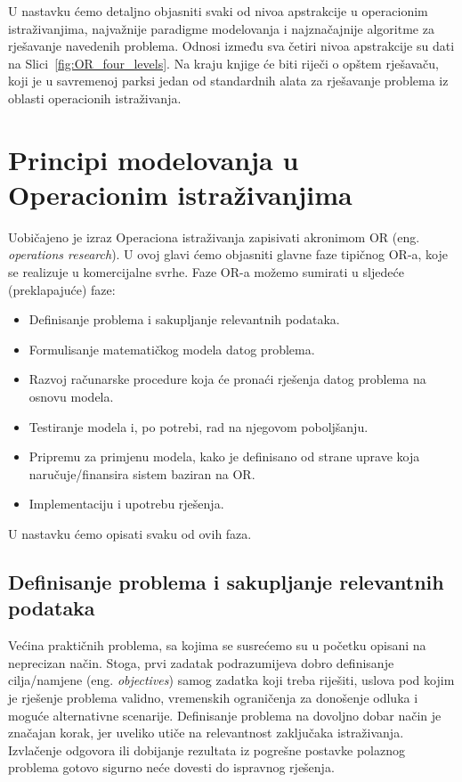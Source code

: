 \documentclass[a4paper, utf8, 11pt, colorlinks]{book}
\theoremstyle{definition}
\begin{document}
U nastavku ćemo detaljno objasniti svaki od nivoa apstrakcije u operacionim istraživanjima, najvažnije paradigme modelovanja i najznačajnije algoritme za rješavanje navedenih problema. Odnosi između sva četiri nivoa apstrakcije su dati na Slici~\ref{fig:OR_four_levels}. 
 Na kraju knjige će biti riječi o opštem rješavaču, koji je u savremenoj parksi jedan od standardnih alata za rješavanje problema iz oblasti operacionih istraživanja.
 
 
\chapter{Principi modelovanja u Operacionim istraživanjima}
Uobičajeno je izraz Operaciona istraživanja zapisivati akronimom OR (eng. \emph{operations research}). 
U ovoj glavi ćemo objasniti   glavne faze tipičnog OR-a, koje se realizuje u  komercijalne svrhe. Faze OR-a možemo sumirati u sljedeće (preklapajuće) faze: 
\begin{itemize}
    \item Definisanje problema i sakupljanje relevantnih podataka.
    \item Formulisanje matematičkog modela datog problema.
    \item Razvoj računarske procedure koja će pronaći rješenja datog problema na osnovu modela.
    \item Testiranje modela i, po potrebi, rad na njegovom poboljšanju.
    \item Pripremu za primjenu modela, kako je definisano od strane uprave koja naručuje/finansira sistem baziran na OR.
    \item Implementaciju i upotrebu rješenja.
\end{itemize}
 U nastavku ćemo opisati svaku od ovih faza.
 
 \section{Definisanje problema i sakupljanje relevantnih podataka}
 
Većina praktičnih problema, sa kojima se susrećemo  su u početku opisani na neprecizan način. Stoga, prvi zadatak podrazumijeva dobro definisanje  cilja/namjene  (eng. \emph{objectives}) samog zadatka koji treba riješiti, uslova pod kojim je rješenje problema validno,  vremenskih ograničenja za donošenje odluka i moguće alternativne scenarije.  Definisanje problema na dovoljno dobar način je značajan korak, jer uveliko utiče na relevantnost zaključaka istraživanja. Izvlačenje odgovora ili dobijanje rezultata iz pogrešne postavke polaznog problema gotovo sigurno neće dovesti do ispravnog rješenja.  
\end{document}

